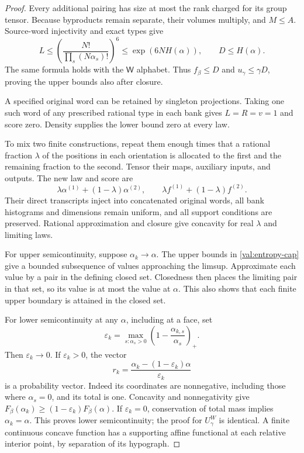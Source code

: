 \begin{proof}
Every additional pairing has size at most the rank charged for its group
tensor.  Because byproducts remain separate, their volumes multiply, and
$M\le A$.  Source-word injectivity and exact types give
\[
 L\le\left(\frac{N!}{\prod_s(N\alpha_s)!}\right)^6
 \le \exp(6NH(\alpha)),
 \qquad D\le H(\alpha).
\]
The same formula holds with the $\mathsf W$ alphabet.  Thus $f_\beta\le D$ and
$u_\gamma\le\gamma D$, proving the upper bounds also after closure.

A specified original word can be retained by singleton projections.  Taking
one such word of any prescribed rational type in each bank gives $L=R=v=1$
and score zero.  Density supplies the lower bound zero at every law.

To mix two finite constructions, repeat them enough times that a rational
fraction $\lambda$ of the positions in each orientation is allocated to the
first and the remaining fraction to the second.  Tensor their maps, auxiliary
inputs, and outputs.  The new law and score are
\[
 \lambda\alpha^{(1)}+(1-\lambda)\alpha^{(2)},\qquad
 \lambda f^{(1)}+(1-\lambda)f^{(2)}.
\]
Their direct transcripts inject into concatenated original words, all bank
histograms and dimensions remain uniform, and all support conditions are
preserved.  Rational approximation and closure give concavity for real
$\lambda$ and limiting laws.

For upper semicontinuity, suppose $\alpha_k\to\alpha$.  The upper bounds in
\eqref{val:entropy-cap} give a bounded subsequence of values approaching the
limsup.  Approximate each value by a pair in the defining closed set.  Closedness
then places the limiting pair in that set, so its value is at most the value
at $\alpha$.  This also shows that each finite upper boundary is attained in
the closed set.

For lower semicontinuity at any $\alpha$, including at a face, set
\[
 \varepsilon_k=
 \max_{s:\alpha_s>0}
       \left(1-\frac{\alpha_{k,s}}{\alpha_s}\right)_+.
\]
Then $\varepsilon_k\to0$.  If $\varepsilon_k>0$, the vector
\[
 r_k=\frac{\alpha_k-(1-\varepsilon_k)\alpha}{\varepsilon_k}
\]
is a probability vector.  Indeed its coordinates are nonnegative, including
those where $\alpha_s=0$, and its total is one.  Concavity and nonnegativity
give $F_\beta(\alpha_k)\ge(1-\varepsilon_k)F_\beta(\alpha)$.
If $\varepsilon_k=0$, conservation of total mass implies
$\alpha_k=\alpha$.  This proves lower semicontinuity; the proof for $U^W_\gamma$
is identical.  A finite continuous concave function has a supporting affine
functional at each relative interior point, by separation of its hypograph.
\end{proof}

